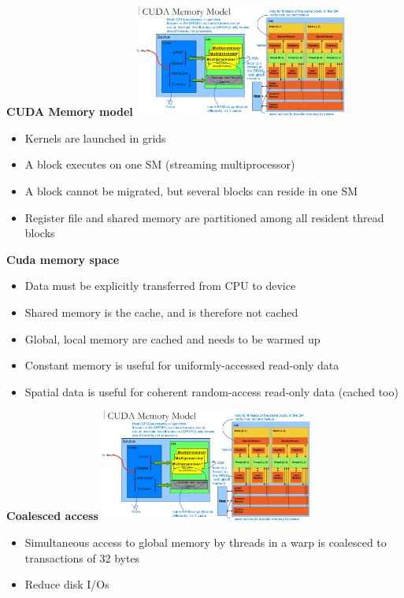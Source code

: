 \documentclass[10pt, landscape]{article}
\begin{document}
\begin{multicols}{4}
 \textbf{CUDA Memory model}
 \includegraphics*[width=7cm]{cuda_mem_model.png}
  \begin{itemize}
     \item Kernels are launched in grids 
     \item A block executes on one SM (streaming multiprocessor)
     \item A block cannot be migrated, but several blocks can reside in one SM 
     \item Register file and shared memory are partitioned among all resident thread blocks 
  \end{itemize}

  \textbf{Cuda memory space}
  \begin{itemize}
    \item Data must be explicitly transferred from CPU to device
    \item Shared memory is the cache, and is therefore not cached 
    \item Global, local memory are cached and needs to be warmed up 
    \item Constant memory is useful for uniformly-accessed read-only data 
    \item Spatial data is useful for coherent random-access read-only data (cached too)
  \end{itemize}

\textbf{Coalesced access}
\includegraphics*[width=7cm]{cuda_mem_model.png}
\begin{itemize}
    \item Simultaneous access to global memory by threads in a warp is coalesced to transactions of 32 bytes 
    \item Reduce disk I/Os
\end{itemize}


\end{multicols}
\end{document}
